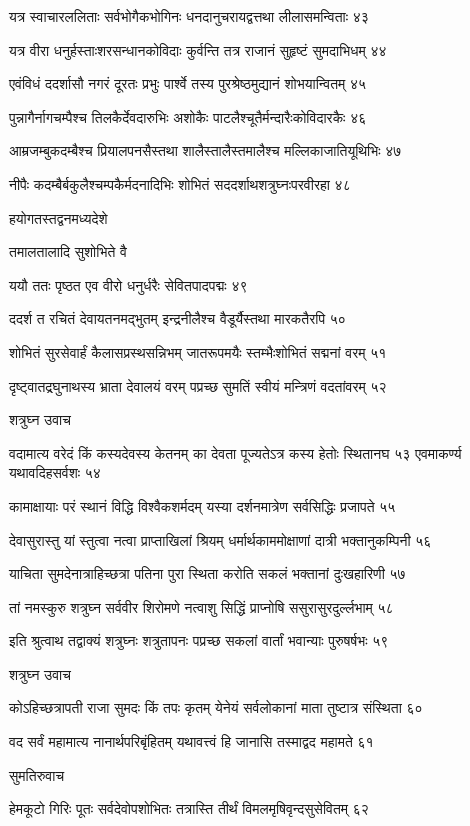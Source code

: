 यत्र स्वाचारललिताः सर्वभोगैकभोगिनः
धनदानुचरायद्वत्तथा लीलासमन्विताः ४३

यत्र वीरा धनुर्हस्ताःशरसन्धानकोविदाः
कुर्वन्ति तत्र राजानं सुहृष्टं सुमदाभिधम् ४४

एवंविधं ददर्शासौ नगरं दूरतः प्रभुः
पार्श्वे तस्य पुरश्रेष्ठमुद्यानं शोभयान्वितम् ४५

पुन्नागैर्नागचम्पैश्च तिलकैर्देवदारुभिः
अशोकैः पाटलैश्चूतैर्मन्दारैःकोविदारकैः ४६

आम्रजम्बुकदम्बैश्च प्रियालपनसैस्तथा
शालैस्तालैस्तमालैश्च मल्लिकाजातियूथिभिः ४७

नीपैः कदम्बैर्बकुलैश्चम्पकैर्मदनादिभिः
शोभितं सददर्शाथशत्रुघ्नःपरवीरहा ४८

हयोगतस्तद्वनमध्यदेशे

तमालतालादि सुशोभिते वै

ययौ ततः पृष्ठत एव वीरो
धनुर्धरैः सेवितपादपद्मः ४९

ददर्श त रचितं देवायतनमद्भुतम्
इन्द्रनीलैश्च वैडूर्यैस्तथा मारकतैरपि ५०

शोभितं सुरसेवार्हं कैलासप्रस्थसन्निभम्
जातरूपमयैः स्तम्भैःशोभितं सद्मनां वरम् ५१

दृष्ट्वातद्रघुनाथस्य भ्राता देवालयं वरम्
पप्रच्छ सुमतिं स्वीयं मन्त्रिणं वदतांवरम् ५२

शत्रुघ्न उवाच

वदामात्य वरेदं किं कस्यदेवस्य केतनम्
का देवता पूज्यतेऽत्र कस्य हेतोः स्थितानघ ५३
एवमाकर्ण्य यथावदिहसर्वशः ५४

कामाक्षायाः परं स्थानं विद्धि विश्वैकशर्मदम्
यस्या दर्शनमात्रेण सर्वसिद्धिः प्रजापते ५५

देवासुरास्तु यां स्तुत्वा नत्वा प्राप्ताखिलां श्रियम्
धर्मार्थकाममोक्षाणां दात्री भक्तानुकम्पिनी ५६

याचिता सुमदेनात्राहिच्छत्रा पतिना पुरा
स्थिता करोति सकलं भक्तानां दुःखहारिणी ५७

तां नमस्कुरु शत्रुघ्न सर्ववीर शिरोमणे
नत्वाशु सिद्धिं प्राप्नोषि ससुरासुरदुर्ल्लभाम् ५८

इति श्रुत्वाथ तद्वाक्यं शत्रुघ्नः शत्रुतापनः
पप्रच्छ सकलां वार्तां भवान्याः पुरुषर्षभः ५९

शत्रुघ्न उवाच

कोऽहिच्छत्रापती राजा सुमदः किं तपः कृतम्
येनेयं सर्वलोकानां माता तुष्टात्र संस्थिता ६०

वद सर्वं महामात्य नानार्थपरिबृंहितम्
यथावत्त्वं हि जानासि तस्माद्वद महामते ६१

सुमतिरुवाच

हेमकूटो गिरिः पूतः सर्वदेवोपशोभितः
तत्रास्ति तीर्थं विमलमृषिवृन्दसुसेवितम् ६२

